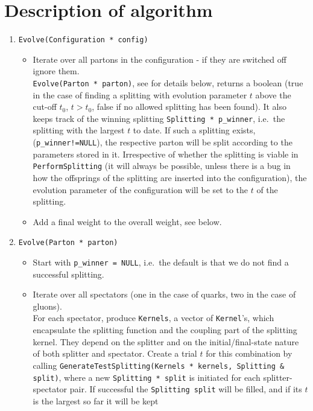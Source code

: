 \documentclass[a4]{article}
\begin{document}
\section{Description of algorithm}
\begin{enumerate}
\item {\tt Evolve(Configuration * config)}\\
  \begin{itemize}
  \item Iterate over all partons in the configuration - if they are switched off ignore them.\\
    {\tt Evolve(Parton * parton)}, see for details below, returns a boolean (true in the
    case of finding a splitting with evolution parameter $t$ above the cut-off $t_0$, $t>t_0$,
    false if no allowed splitting has been found).  It also keeps track of the winning
    splitting {\tt Splitting * p\_winner}, i.e.\ the splitting with the largest $t$ to date.
    If such a splitting exists, ({\tt p\_winner!=NULL}), the respective parton will be split
    according to the parameters stored in it.  Irrespective of whether the splitting is viable
    in {\tt PerformSplitting} (it will always be possible, unless there is a bug in how the
    offsprings of the splitting are inserted into the configuration), the evolution
    parameter of the configuration will be set to the $t$ of the splitting.
  \item Add a final weight to the overall weight, see below.
  \end{itemize}
\item {\tt Evolve(Parton * parton)}\\
  \begin{itemize}
  \item Start with {\tt p\_winner = NULL}, i.e.\ the default is that we do not find a successful
    splitting.
  \item Iterate over all spectators (one in the case of quarks, two in the case of gluons).\\
    For each spectator, produce {\tt Kernels}, a vector of {\tt Kernel}'s, which encapsulate the
    splitting function and the coupling part of the splitting kernel.  They depend on the splitter
    and on the initial/final-state nature of both splitter and spectator.  Create a trial $t$ for
    this combination by calling
    {\tt GenerateTestSplitting(Kernels * kernels, Splitting \& split)}, where a new
    {\tt Splitting * split} is initiated for each splitter-spectator pair.  If successful the
    {\tt Splitting split} will be filled, and if its $t$ is the largest so far it will be kept

\end{itemize}
\end{enumerate}
\end{document}
